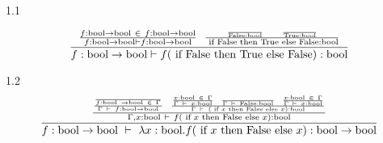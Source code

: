 \documentclass[12pt,letterpaper]{article}
\newcommand{\hwSubSect}[1]{\noindent\large#1\normalsize\newline}
\newcommand{\ifst}[3]{\text{ if } #1 \text{ then } #2 \text{ else } #3}
\newcommand{\true}{\text{True}}
\newcommand{\false}{\text{False}}
\newcommand{\bool}{\text{bool}}
\begin{document}
\hwSubSect{1.1}

\begin{eqnarray*}
{
{{f : \bool \rightarrow \bool~\in~f : \bool \rightarrow \bool}
\over{f : \bool \rightarrow \bool \vdash f: \bool \rightarrow \bool}}
~~
{
	{
		{{}\over{\false : \bool}}
		~~~~~
		{{}\over{\true : \bool}}
	}
\over{\ifst{\false}{\true}{\false} : \bool}}
}
\over{f : \bool \rightarrow \bool \vdash f (\ifst{\false}{\true}{\false} ) : \bool}
\end{eqnarray*}

\hwSubSect{1.2}
\begin{eqnarray*}
{
	{
		{
		{
			{}
			\over{f : \bool~\rightarrow\bool~\in~\Gamma}
		}
		\over{\Gamma~\vdash~f  : \bool \rightarrow \bool}
		}
		~~
		{
		{
			{
			{x : \bool~\in~\Gamma}
			\over{\Gamma~\vdash~x : \bool}
			}
			~~
			{
			{}
			\over{\Gamma~\vdash~\false : \bool}
			}
			~~
			{
			{x : \bool~\in~\Gamma}
			\over{\Gamma~\vdash~x : \bool}
			}
		}
		\over{\Gamma~\vdash~(\ifst{x}{\false}{x}) : \bool}
		}
	}
	\over{\Gamma, x : \bool~\vdash~f (\ifst{x}{\false}{x}) : \bool}
}
\over{f : \bool \rightarrow \bool~\vdash~\lambda x : \bool . f (\ifst{x}{\false}{x}) : \bool \rightarrow \bool}
\end{eqnarray*}
\end{document}
